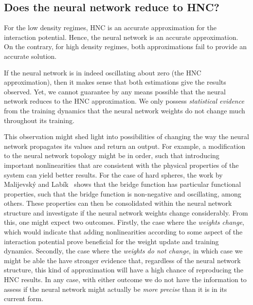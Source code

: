 \subsection{Does the neural network reduce to HNC?}
For the low density regimes, HNC is an accurate approximation for the interaction potential.
Hence, the neural network is an accurate approximation. On the contrary, for high density
regimes, both approximations fail to provide an accurate solution.

If the neural network is in indeed oscillating about zero (the HNC approximation), then
it makes sense that both estimations give the results observed. Yet, we cannot guarantee
by any means possible that the neural network reduces to the HNC approximation.
We only possess \emph{statistical evidence} from the training dynamics that the neural
network weights do not change much throughout its training.

This observation might shed light into possibilities of changing the way the neural
network propagates its values and return an output. For example, a modification to the
neural network topology might be in order, such that introducing important 
nonlinearities that are consistent with the physical properties of the system can yield
better results. For the case of hard spheres, the work by Malijevský and Labík~\cite{malijevskyBridgeFunctionHard1987}
shows that the bridge function has particular functional properties, such that the
bridge function is non-negative and oscillating, among others. These properties can then
be consolidated within the neural network structure and investigate if the neural network 
weights change considerably.
From this, one might expect two outcomes. Firstly, the case where the \emph{weights change},
which would indicate that adding nonlinearities according to some aspect of the interaction 
potential prove beneficial for the weight update and training dynamics.
Secondly, the case where the \emph{weights do not change}, in which case we might
be able the have stronger evidence that, regardless of the neural network structure,
this kind of approximation will have a high chance of reproducing the HNC results.
In any case, with either outcome we do not have the information to assess if the neural
network might actually be \emph{more precise} than it is in its current form.

